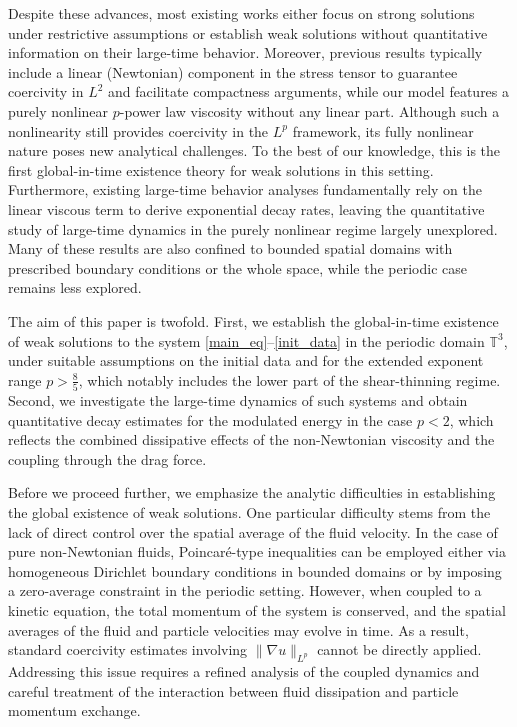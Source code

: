 \documentclass[10pt,reqno]{amsart}
\numberwithin{equation}{section}
\newcommand{\T}{\mathbb T}
\begin{document}
Despite these advances, most existing works either focus on strong solutions under restrictive assumptions or establish weak solutions without quantitative information on their large-time behavior. Moreover, previous results typically include a linear (Newtonian) component in the stress tensor to guarantee coercivity in $L^2$ and facilitate compactness arguments, while our model features a purely nonlinear $p$-power law viscosity without any linear part. Although such a nonlinearity still provides coercivity in the $L^p$ framework, its fully nonlinear nature poses new analytical challenges. To the best of our knowledge, this is the first global-in-time existence theory for weak solutions in this setting. Furthermore, existing large-time behavior analyses fundamentally rely on the linear viscous term to derive exponential decay rates, leaving the quantitative study of large-time dynamics in the purely nonlinear regime largely unexplored. Many of these results are also confined to bounded spatial domains with prescribed boundary conditions or the whole space, while the periodic case remains less explored.
 

The aim of this paper is twofold. First, we establish the global-in-time existence of weak solutions to the system \eqref{main_eq}--\eqref{init_data} in the periodic domain $\T^3$, under suitable assumptions on the initial data and for the extended exponent range $p > \frac85$, which notably includes the lower part of the shear-thinning regime. Second, we investigate the large-time dynamics of such systems and obtain quantitative decay estimates for the modulated energy in the case $p < 2$, which reflects the combined dissipative effects of the non-Newtonian viscosity and the coupling through the drag force.


Before we proceed further, we emphasize the analytic difficulties in establishing the global existence of weak solutions. One particular difficulty stems from the lack of direct control over the spatial average of the fluid velocity. In the case of pure non-Newtonian fluids, Poincar\'e-type inequalities can be employed either via homogeneous Dirichlet boundary conditions in bounded domains or by imposing a zero-average constraint in the periodic setting. However, when coupled to a kinetic equation, the total momentum of the system is conserved, and the spatial averages of the fluid and particle velocities may evolve in time. As a result, standard coercivity estimates involving $\|\nabla u\|_{L^p}$ cannot be directly applied. Addressing this issue requires a refined analysis of the coupled dynamics and careful treatment of the interaction between fluid dissipation and particle momentum exchange.
\end{document}
